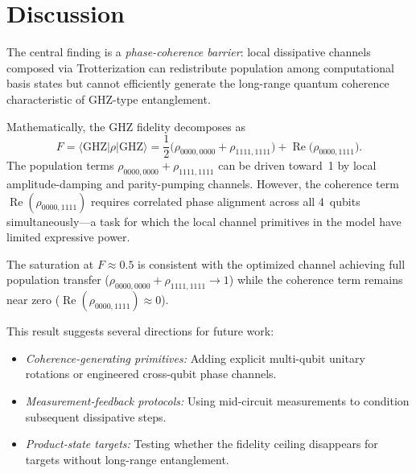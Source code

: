 \documentclass[11pt,a4paper]{article}
\newcommand{\ket}[1]{\lvert #1 \rangle}
\newcommand{\bra}[1]{\langle #1 \rvert}
\begin{document}
\section{Discussion}

The central finding is a \emph{phase-coherence barrier}: local
dissipative channels composed via Trotterization can redistribute
population among computational basis states but cannot efficiently
generate the long-range quantum coherence characteristic of
GHZ-type entanglement.

Mathematically, the GHZ fidelity decomposes as
\begin{equation}
  F = \bra{\mathrm{GHZ}}\rho\ket{\mathrm{GHZ}}
  = \frac{1}{2}\bigl(\rho_{0000,0000} + \rho_{1111,1111}\bigr)
  + \operatorname{Re}\bigl(\rho_{0000,1111}\bigr).
\end{equation}
The population terms $\rho_{0000,0000}+\rho_{1111,1111}$ can be
driven toward~1 by local amplitude-damping and parity-pumping
channels.  However, the coherence term
$\operatorname{Re}(\rho_{0000,1111})$ requires correlated phase
alignment across all 4~qubits simultaneously---a task for which
the local channel primitives in the model have limited expressive
power.

The saturation at $F\approx 0.5$ is consistent with the optimized
channel achieving full population transfer
($\rho_{0000,0000}+\rho_{1111,1111}\to 1$)
while the coherence term remains near zero
($\operatorname{Re}(\rho_{0000,1111})\approx 0$).

This result suggests several directions for future work:
\begin{itemize}
  \item \emph{Coherence-generating primitives:}
    Adding explicit multi-qubit unitary rotations or
    engineered cross-qubit phase channels.
  \item \emph{Measurement-feedback protocols:}
    Using mid-circuit measurements to condition
    subsequent dissipative steps.
  \item \emph{Product-state targets:}
    Testing whether the fidelity ceiling disappears
    for targets without long-range entanglement.
\end{itemize}
\end{document}
